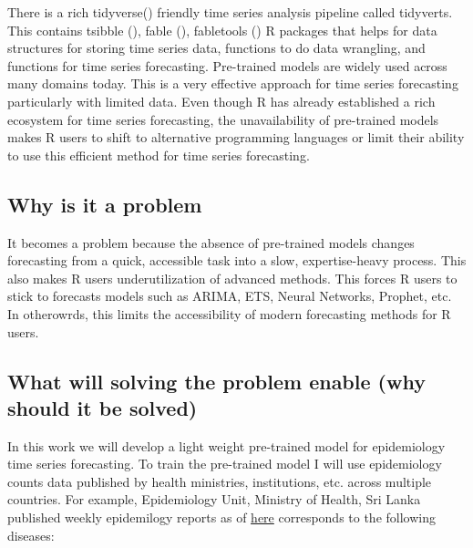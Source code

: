 \documentclass[
]{article}
\begin{document}
There is a rich tidyverse()
friendly time series analysis pipeline called tidyverts. This contains
tsibble (), fable
(), fabletools
() R
packages that helps for data structures for storing time series data,
functions to do data wrangling, and functions for time series
forecasting. Pre-trained models are widely used across many domains
today. This is a very effective approach for time series forecasting
particularly with limited data. Even though R has already established a
rich ecosystem for time series forecasting, the unavailability of
pre-trained models makes R users to shift to alternative programming
languages or limit their ability to use this efficient method for time
series forecasting.

\subsection{Why is it a problem}\label{why-is-it-a-problem}

It becomes a problem because the absence of pre-trained models changes
forecasting from a quick, accessible task into a slow, expertise-heavy
process. This also makes R users underutilization of advanced methods.
This forces R users to stick to forecasts models such as ARIMA, ETS,
Neural Networks, Prophet, etc. In otherowrds, this limits the
accessibility of modern forecasting methods for R users.

\subsection{What will solving the problem enable (why should it be
solved)}\label{what-will-solving-the-problem-enable-why-should-it-be-solved}

In this work we will develop a light weight pre-trained model for
epidemiology time series forecasting. To train the pre-trained model I
will use epidemiology counts data published by health ministries,
institutions, etc. across multiple countries. For example, Epidemiology
Unit, Ministry of Health, Sri Lanka published weekly epidemilogy reports
as of
\href{https://www.epid.gov.lk/weekly-epidemiological-report/weekly-epidemiological-report}{here}
corresponds to the following diseases:
\end{document}
